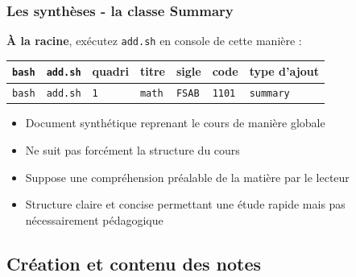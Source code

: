 \documentclass{beamer}
\begin{document}
\begin{frame}
    \frametitle{Les synthèses - la classe Summary}
    \begin{exampleblock}{\textbf{À la racine}, exécutez \lstinline|add.sh| en
    console de cette manière :}
       \begin{tabular}{lllllll}
           \lstinline|bash| & \lstinline|add.sh| & quadri & titre & sigle & code & type d'ajout
           \\ \hline
           \lstinline|bash| & \lstinline|add.sh| & \lstinline|1| & \lstinline|math| & \lstinline|FSAB| & \lstinline|1101| & \lstinline|summary| \\
       \end{tabular}
    \end{exampleblock}
    \bigskip

    \begin{itemize}
        \item Document synthétique reprenant le cours de manière globale
        \item Ne suit pas forcément la structure du cours
        \item Suppose une compréhension préalable de la matière par le
            lecteur
        \item Structure claire et concise permettant une étude rapide
            mais pas nécessairement pédagogique
    \end{itemize}
\end{frame}

\subsection{Création et contenu des notes}
\end{document}
